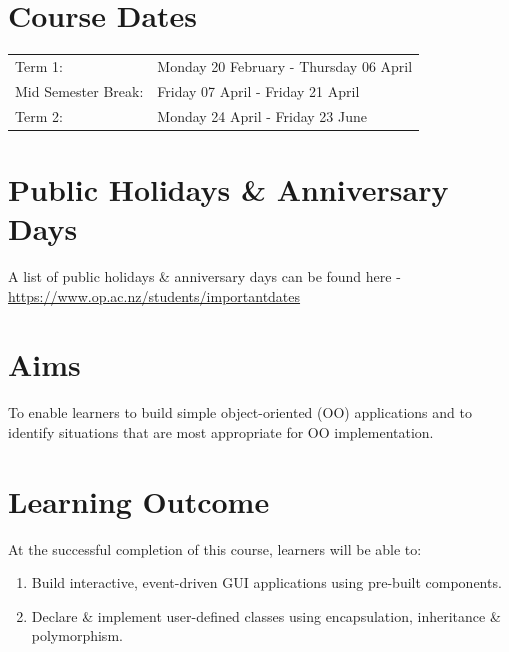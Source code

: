 \documentclass{article}
\begin{document}
\section*{Course Dates} 
\begin{tabular}{ll}
	Term 1:             &  Monday 20 February - Thursday 06 April \\
	Mid Semester Break: &  Friday 07 April - Friday 21 April     \\
	Term 2:             &  Monday 24 April - Friday 23 June      \\
\end{tabular}

\section*{Public Holidays \& Anniversary Days}
A list of public holidays \& anniversary days can be found here - \href{https://www.op.ac.nz/students/importantdates}{https://www.op.ac.nz/students/importantdates}

\section*{Aims}
To enable learners to build simple object-oriented (OO) applications and to identify situations that are most appropriate for OO implementation.

\section*{Learning Outcome}
At the successful completion of this course, learners will be able to:
\begin{enumerate}
	\item Build interactive, event-driven GUI applications using pre-built components.
	\item Declare \& implement user-defined classes using encapsulation, inheritance \& polymorphism.
\end{enumerate}
\end{document}
